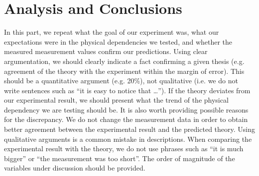 \documentclass[12pt,a4paper]{article}
\begin{document}
	\section{Analysis and Conclusions}
	In this part, we repeat what the goal of our experiment was, what our expectations were in the physical dependencies we tested, and whether the measured measurement values confirm our predictions. 
	Using clear argumentation, we should clearly indicate a fact confirming a given thesis (e.g. agreement of the theory with the experiment within the margin of error). 
	This should be a quantitative argument (e.g. 20\%), not qualitative (i.e. we do not write sentences such as ``it is easy to notice that \dots''). 
	If the theory deviates from our experimental result, we should present what the trend of the physical dependency we are testing should be. 
	It is also worth providing possible reasons for the discrepancy. 
	We do not change the measurement data in order to obtain better agreement between the experimental result and the predicted theory. 
	Using qualitative arguments is a common mistake in descriptions. 
	When comparing the experimental result with the theory, we do not use phrases such as ``it is much bigger'' or ``the measurement was too short''. 
	The order of magnitude of the variables under discussion should be provided.
\end{document}
